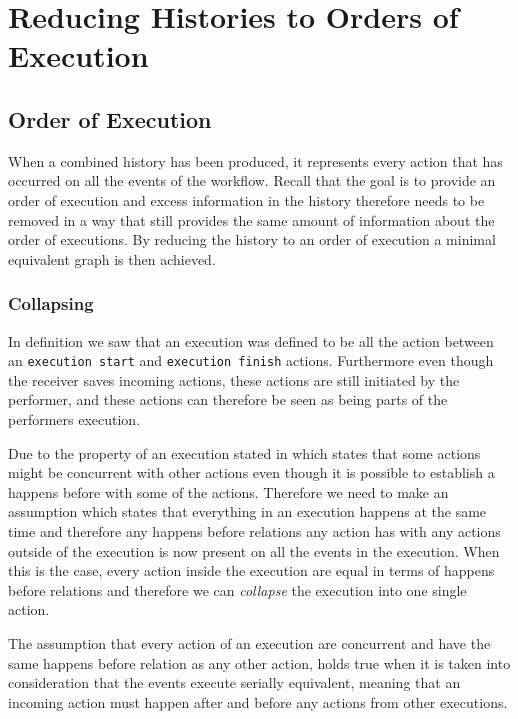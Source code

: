 \chapter{Reducing Histories to Orders of Execution}
\label{chap:order-of-execution}
\section{Order of Execution}
	When a combined history has been produced, it represents every action that has occurred on all the events of the workflow. 
	Recall that the goal is to provide an order of execution and excess information in the history therefore needs to be removed in a way that still provides the same amount of information about the order of executions. By reducing the history to an order of execution a minimal equivalent graph is then achieved.
	
	\subsection{Collapsing}
	In definition  we saw that an execution was defined to be all the action between an \texttt{execution start} and \texttt{execution finish} actions. Furthermore even though the receiver saves incoming actions, these actions are still initiated by the performer, and these actions can therefore be seen as being parts of the performers execution. 
	
	\newpar Due to the property of an execution stated in  which states that some actions might be concurrent with other actions even though it is possible to establish a happens before with some of the actions. Therefore we need to make an assumption which states that everything in an execution happens at the same time and therefore any happens before relations  any action has with any actions outside of the execution is now present on all the events in the execution. When this is the case, every action inside the execution are equal in terms of happens before relations and therefore we can \textit{collapse} the execution into one single action.
	
	The assumption that every action of an execution are concurrent and have the same happens before relation as any other action, holds true when it is taken into consideration that the events execute serially equivalent, meaning that an incoming action must happen after and before any actions from other executions. 
		
